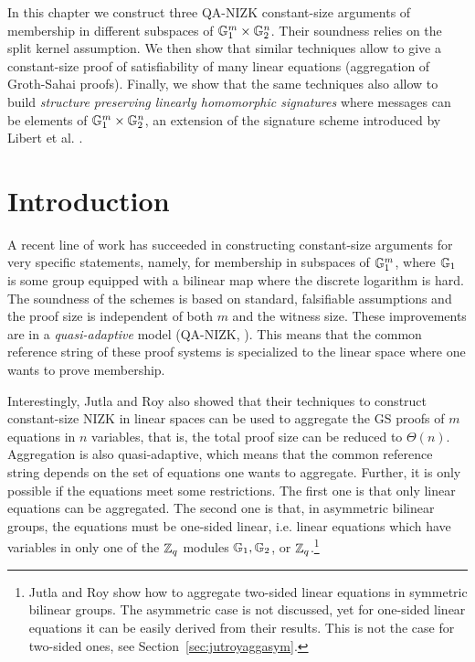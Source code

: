 
In this chapter we construct three QA-NIZK {constant-size} arguments of membership in different subspaces of $\mathbb{G}^{m}_1 \times \mathbb{G}^{n}_2$. Their soundness relies on the split kernel assumption. We then show that similar techniques allow to give a {constant-size} proof of satisfiability of many linear equations (aggregation of Groth-Sahai proofs). Finally, we show that the same techniques also allow to build \emph{structure preserving linearly homomorphic signatures} where messages can be elements of $\mathbb{G}_1^m\times\mathbb{G}_2^n$, an extension of the signature scheme introduced by Libert et al. \cite{C:LPJY13}. 
\section{Introduction}
A recent line of work 
  \cite{AC:JutRoy13,C:JutRoy14,EC:KilWee15,EC:LPJY14} 
has succeeded in constructing constant-size  
  arguments for very specific statements, namely, for membership in subspaces of $\mathbb{G}_1^{m}$, 
  where $\mathbb{G}_1$ is some group equipped with a bilinear map where the discrete logarithm is hard. 
The soundness of the schemes is based on standard, falsifiable assumptions 
  and the proof size is independent of both $m$ and the witness size.  These improvements are in a  \textit{quasi-adaptive} 
  model (QA-NIZK, \cite{AC:JutRoy13}).  This means that the common reference string of these proof systems is 
  specialized to the linear space where one wants to prove membership.
  
Interestingly, Jutla and Roy  \cite{C:JutRoy14} also showed that their techniques to construct 
  constant-size NIZK in linear spaces can be used to aggregate the GS proofs of $m$ equations in $n$ variables, that is,  the total proof size can be reduced to $\Theta(n)$.  Aggregation is also quasi-adaptive, 
which means that the common reference string depends on the set of equations one wants to aggregate.   Further, it is only possible if the equations meet some restrictions. The first one is that only linear equations can be aggregated. The second one is that, in asymmetric bilinear groups, the equations must be one-sided linear, i.e. linear equations 
  which have variables in only one of the $\mathbb{Z}_q$ modules $\mathbb{G}_1,\mathbb{G}_2$, 
  or $\mathbb{Z}_q$.\footnote{Jutla and Roy show how to aggregate two-sided linear equations in
  symmetric bilinear groups. The asymmetric case is not discussed, 
  yet for one-sided linear equations it can be easily  derived from
  their results. 
  This is not the case for two-sided ones, see Section~\ref{sec:jutroyaggasym}.} 


